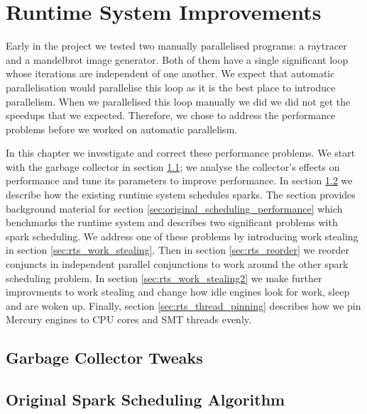 
\chapter{Runtime System Improvements}
\label{chap:rts}


Early in the project
we tested two manually parallelised programs:
a raytracer and a mandelbrot image generator.
Both of them have a single significant loop
whose iterations are independent of one another.
We expect that automatic parallelisation would parallelise this loop
as it is the best place to introduce parallelism.
When we parallelised this loop manually we did
we did not get the speedups that we expected.
Therefore,
we chose to address the performance problems
before we worked on automatic parallelism.

In this chapter we investigate and correct these performance problems.
We start with the garbage collector in section \ref{sec:gc};
we analyse the collector's effects on performance and tune its parameters
to improve performance.
In section \ref{sec:original_scheduling} we describe how the existing runtime
system schedules sparks.
The section provides background material for section
\ref{sec:original_scheduling_performance}
which benchmarks the runtime system and describes two significant problems with
spark scheduling.
We address one of these problems by introducing work stealing in section
\ref{sec:rts_work_stealing}.
Then in section \ref{sec:rts_reorder} we reorder conjuncts in independent
parallel conjunctions to work around the other spark scheduling problem.
In section \ref{sec:rts_work_stealing2} we make further improvments to
work stealing and change how idle engines look for work, sleep and are
woken up.
Finally, section \ref{sec:rts_thread_pinning} describes how we pin Mercury
engines to CPU cores and SMT threads evenly.

\section{Garbage Collector Tweaks}
\label{sec:gc}



\section{Original Spark Scheduling Algorithm}
\label{sec:original_scheduling}



